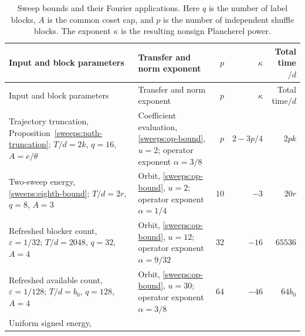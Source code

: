 \begingroup
\small
\setlength{\tabcolsep}{4pt}
\renewcommand{\arraystretch}{1.2}
\begin{longtable}{@{}p{.33\linewidth}p{.29\linewidth}r r r@{}}
\caption{Sweep bounds and their Fourier applications. Here $q$ is the
number of label blocks, $A$ is the common coset cap, and $p$ is the
number of independent shuffle blocks. The exponent $\kappa$ is the
resulting nonsign Plancherel power.}\label{sweeps:transfer-table}\\
\toprule
Input and block parameters & Transfer and norm exponent
 & $p$ & $\kappa$ & Total time$/d$\\
\midrule
\endfirsthead
\toprule
Input and block parameters & Transfer and norm exponent
 & $p$ & $\kappa$ & Total time$/d$\\
\midrule
\endhead
\bottomrule
\endfoot
{}\label{sweeps:assembly-trajectory}
Trajectory truncation,\newline
Proposition~\ref{sweeps:path-truncation};\newline
$T/d=2k$, $q=16$, $A=e/\theta$
&
Coefficient evaluation,\newline
\eqref{sweeps:op-bound}, $u=2$;\newline
operator exponent $\alpha=3/8$
& $p$ & $2-3p/4$ & $2pk$\\
\label{sweeps:assembly-eight-orbits}
Two-sweep energy, \eqref{sweeps:eighth-bound};\newline
$T/d=2r$, $q=8$, $A=3$
&
Orbit, \eqref{sweeps:op-bound}, $u=2$;\newline
operator exponent $\alpha=1/4$
& $10$ & $-3$ & $20r$\\
\label{sweeps:assembly-blocker-orbits}
Refreshed blocker count,\newline
$\varepsilon=1/32$;\newline
$T/d=2048$, $q=32$, $A=4$
&
Orbit, \eqref{sweeps:op-bound}, $u=12$;\newline
operator exponent $\alpha=9/32$
& $32$ & $-16$ & $65536$\\
\label{sweeps:assembly-hole-orbits}
Refreshed available count,\newline
$\varepsilon=1/128$;\newline
$T/d=b_0$, $q=128$, $A=4$
&
Orbit, \eqref{sweeps:op-bound}, $u=30$;\newline
operator exponent $\alpha=3/8$
& $64$ & $-46$ & $64b_0$\\
\label{sweeps:assembly-colored-HS}
Uniform signed energy,\newline

\end{longtable}
